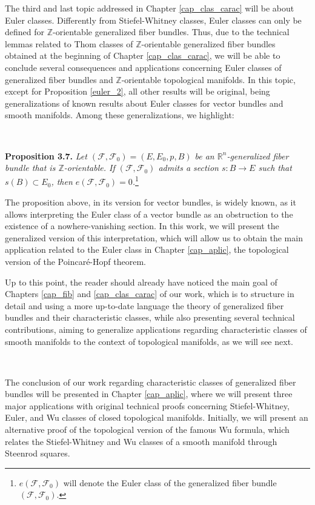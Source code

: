 \documentclass[12pt,oneside]{book}
\newcommand{\R}{\mathbb{R}}
\newcommand{\Z}{\mathbb{Z}}
\begin{document}
    The third and last topic addressed in Chapter \ref{cap_clas_carac} will be about Euler classes. 
    Differently from Stiefel-Whitney classes, Euler classes can only be defined for $\Z$-orientable 
    generalized fiber bundles. Thus, due to the technical lemmas related to Thom classes of $\Z$-orientable 
    generalized fiber bundles obtained at the beginning of Chapter \ref{cap_clas_carac}, we will be able to 
    conclude several consequences and applications concerning Euler classes of generalized fiber bundles and 
    $\Z$-orientable topological manifolds. In this topic, except for Proposition \ref{euler_2}, all other 
    results will be original, being generalizations of known results about Euler classes for vector 
    bundles and smooth manifolds. Among these generalizations, we highlight:

    \

    \textbf{Proposition 3.7.} \textit{Let $(\mathcal{F},\mathcal{F}_{0})=(E,E_{0},p,B)$ be an 
    $\R^{n}$-generalized fiber bundle that is $\Z$-orientable. If $(\mathcal{F},\mathcal{F}_{0})$ admits a 
    section $s:B\to E$ such that $s(B)\subset E_{0}$, then 
    $e(\mathcal{F},\mathcal{F}_{0})=0$.}\footnote{$e(\mathcal{F},\mathcal{F}_{0})$ will denote the Euler 
    class of the generalized fiber bundle $(\mathcal{F},\mathcal{F}_{0})$.}

    The proposition above, in its version for vector bundles, is widely known, as it allows interpreting 
    the Euler class of a vector bundle as an obstruction to the existence of a nowhere-vanishing section. 
    In this work, we will present the generalized version of this interpretation, which will allow us to 
    obtain the main application related to the Euler class in Chapter \ref{cap_aplic}, the topological 
    version of the Poincaré-Hopf theorem.

    Up to this point, the reader should already have noticed the main goal of Chapters \ref{cap_fib} and 
    \ref{cap_clas_carac} of our work, which is to structure in detail and using a more up-to-date 
    language the theory of generalized fiber bundles and their characteristic classes, while also presenting 
    several technical contributions, aiming to generalize applications regarding characteristic classes 
    of smooth manifolds to the context of topological manifolds, as we will see next.

    \

    The conclusion of our work regarding characteristic classes of generalized fiber bundles will be presented 
    in Chapter \ref{cap_aplic}, where we will present three major applications with original technical 
    proofs concerning Stiefel-Whitney, Euler, and Wu classes of closed topological manifolds. Initially, 
    we will present an alternative proof of the topological version of the famous Wu formula, which 
    relates the Stiefel-Whitney and Wu classes of a smooth manifold through Steenrod squares.
\end{document}
